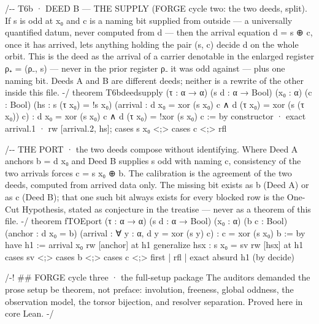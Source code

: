 \documentclass[10pt]{article}
\renewcommand{\_}{\origunderscore\allowbreak}
\newenvironment{Shaded}{}{}
\newcommand{\NormalTok}[1]{#1}
\begin{document}
\begin{Shaded}
\begin{Highlighting}[]
\NormalTok{/{-}{-} T6b · DEED B — THE SUPPLY (FORGE cycle two: the two deeds, split).}
\NormalTok{    If s is odd at x₀ and c is a naming bit supplied from outside — a}
\NormalTok{    universally quantified datum, never computed from d — then the arrival}
\NormalTok{    equation d = s ⊕ c, once it has arrived, lets anything holding the pair}
\NormalTok{    (s, c) decide d on the whole orbit. This is the deed as the arrival of}
\NormalTok{    a carrier denotable in the enlarged register ρ₊ = (ρ₋, s) — never in}
\NormalTok{    the prior register ρ₋ it was odd against — plus one naming bit. Deeds A and B are}
\NormalTok{    different deeds; neither is a rewrite of the other inside this file. {-}/}
\NormalTok{theorem T6b\_deed\_supply (τ : α → α) (s d : α → Bool) (x₀ : α) (c : Bool)}
\NormalTok{    (hs : s (τ x₀) = !s x₀)}
\NormalTok{    (arrival : d x₀ = xor (s x₀) c ∧ d (τ x₀) = xor (s (τ x₀)) c) :}
\NormalTok{    d x₀ = xor (s x₀) c ∧ d (τ x₀) = !xor (s x₀) c := by}
\NormalTok{  constructor}
\NormalTok{  · exact arrival.1}
\NormalTok{  · rw [arrival.2, hs]; cases s x₀ \textless{};\textgreater{} cases c \textless{};\textgreater{} rfl}

\NormalTok{/{-}{-} THE PORT · the two deeds compose without identifying.}
\NormalTok{    Where Deed A anchors b = d x₀ and Deed B supplies s odd with naming c,}
\NormalTok{    consistency of the two arrivals forces c = s x₀ ⊕ b. The calibration}
\NormalTok{    is the agreement of the two deeds, computed from arrived data only.}
\NormalTok{    The missing bit exists as b (Deed A) or as c (Deed B); that one such}
\NormalTok{    bit always exists for every blocked row is the One{-}Cut Hypothesis,}
\NormalTok{    stated as conjecture in the treatise — never as a theorem of this file. {-}/}
\NormalTok{theorem fTOE\_port (\_τ : α → α) (s d : α → Bool) (x₀ : α) (b c : Bool)}
\NormalTok{    (anchor : d x₀ = b)}
\NormalTok{    (arrival : ∀ y : α, d y = xor (s y) c) :}
\NormalTok{    c = xor (s x₀) b := by}
\NormalTok{  have h1 := arrival x₀}
\NormalTok{  rw [anchor] at h1}
\NormalTok{  generalize hsx : s x₀ = sv}
\NormalTok{  rw [hsx] at h1}
\NormalTok{  cases sv \textless{};\textgreater{} cases b \textless{};\textgreater{} cases c \textless{};\textgreater{} first | rfl | exact absurd h1 (by decide)}

\NormalTok{/{-}! \#\# FORGE cycle three · the full{-}setup package}
\NormalTok{    The auditors demanded the prose setup be theorem, not preface:}
\NormalTok{    involution, freeness, global oddness, the observation model, the}
\NormalTok{    torsor bijection, and resolver separation. Proved here in core Lean. {-}/}


\end{Highlighting}
\end{Shaded}
\end{document}

